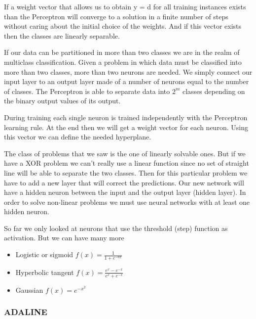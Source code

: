 If a weight vector that allows us to obtain y = d for all training instances exists than the Perceptron will converge to a solution in a finite number of steps without caring about the initial choice of the weights. And if this vector exists then the classes are linearly separable. 

\vspace{10pt}

If our data can be partitioned in more than two classes we are in the realm of multiclass classification. Given a problem in which data must be classified into more than two classes, more than two neurons are needed. We simply connect our input layer to an output layer made of a number of neurons equal to the number of classes. The Perceptron is able to separate data into $2^m$ classes depending on the binary output values of its output. 

\vspace{10pt}

During training each single neuron is trained independently with the Perceptron learning rule. At the end then we will get a weight vector for each neuron. Using this vector we can define the needed hyperplane.

\vspace{10pt}

The class of problems that we saw is the one of linearly solvable ones. But if we have a XOR problem we can't really use a linear function since no set of straight line will be able to separate the two classes. Then for this particular problem we have to add a new layer that will correct the predictions. Our new network will have a hidden neuron between the input and the output layer (hidden layer). In order to solve non-linear problems we must use neural networks with at least one hidden neuron.


\vspace{10pt}

So far we only looked at neurons that use the threshold (step) function as activation. But we can have many more 

\begin{itemize}
    \item Logistic or sigmoid $f(x)= \frac{1}{1+e^{-ax}}$
    \item Hyperbolic tangent $f(x) = \frac{e^x - e^{-x}}{e^x+e^{-x}}$
    \item Gaussian $f(x) = e^{-x^2}$
\end{itemize}

\subsubsection{ADALINE}

